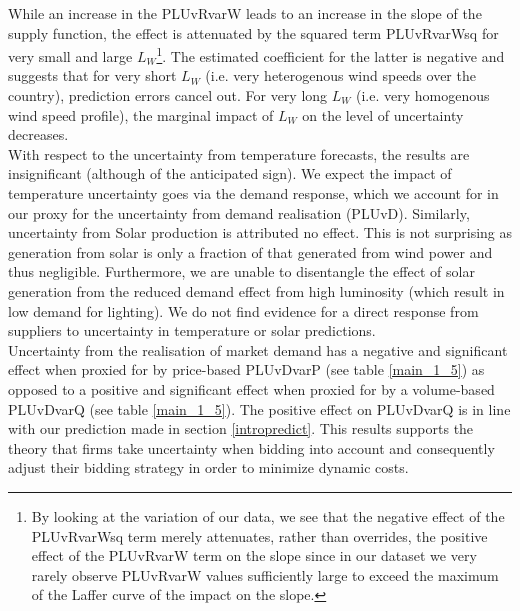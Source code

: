 While an increase in the PLUvRvarW leads to an increase in the slope of the supply function, the effect is attenuated by the squared term PLUvRvarWsq 
for very small and large $L_W$\footnote{By looking at the variation of our data, we see that the negative effect of the PLUvRvarWsq term merely attenuates, rather than overrides, the positive effect of the PLUvRvarW term on the slope since in our dataset we very rarely observe PLUvRvarW values sufficiently large to exceed the maximum of the Laffer curve of the impact on the slope.}. The estimated coefficient for the latter is negative and suggests that for very short $L_W$ (i.e. very heterogenous wind speeds over the country), prediction errors cancel out. For very long $L_W$ (i.e. very homogenous wind speed profile), the marginal impact of $L_W$ on the level of uncertainty decreases. \\


With respect to the uncertainty from temperature forecasts, the results are insignificant (although of the anticipated sign). We expect the impact of temperature uncertainty goes via the demand response, which we account for in our proxy for the uncertainty from demand realisation (PLUvD). Similarly, uncertainty from Solar production is attributed no effect. This is not surprising as 
generation from solar is only a fraction of that generated from wind power and thus negligible.
Furthermore, we are unable to disentangle the effect of solar generation from the reduced demand effect from high luminosity (which result in low demand for lighting). We do not find evidence for a direct response from suppliers to uncertainty in temperature or solar predictions. \\

Uncertainty from the realisation of market demand has a negative and significant effect when proxied for by price-based PLUvDvarP (see table \ref{main_1_5}) as opposed to a positive and significant effect when proxied for by a volume-based PLUvDvarQ (see table \ref{main_1_5}). 
The positive effect on PLUvDvarQ is in line with our prediction made in section \ref{intropredict}. This results supports the theory that firms take uncertainty when bidding into account and consequently adjust their bidding strategy in order to minimize dynamic costs. \\

